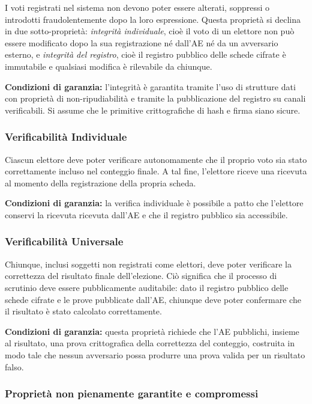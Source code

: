 \documentclass[12pt,a4paper]{article}
\begin{document}
I voti registrati nel sistema non devono poter essere alterati, soppressi o introdotti
fraudolentemente dopo la loro espressione. Questa proprietà si declina in due sotto-proprietà:
\textit{integrità individuale}, cioè il voto di un elettore non può essere modificato dopo la
sua registrazione né dall'AE né da un avversario esterno, e \textit{integrità del registro},
cioè il registro pubblico delle schede cifrate è immutabile e qualsiasi modifica è rilevabile
da chiunque.

\textbf{Condizioni di garanzia:} l'integrità è garantita tramite l'uso di strutture dati con
proprietà di non-ripudiabilità e tramite la pubblicazione del registro su canali verificabili.
Si assume che le primitive crittografiche di hash e firma siano sicure.

\subsubsection{Verificabilità Individuale}

Ciascun elettore deve poter verificare autonomamente che il proprio voto sia stato
correttamente incluso nel conteggio finale. A tal fine, l'elettore riceve una ricevuta al
momento della registrazione della propria scheda.

\textbf{Condizioni di garanzia:} la verifica individuale è possibile a patto che l'elettore
conservi la ricevuta ricevuta dall'AE e che il registro pubblico sia accessibile.

\subsubsection{Verificabilità Universale}

Chiunque, inclusi soggetti non registrati come elettori, deve poter verificare la correttezza
del risultato finale dell'elezione. Ciò significa che il processo di scrutinio deve essere
pubblicamente auditabile: dato il registro pubblico delle schede cifrate e le prove pubblicate
dall'AE, chiunque deve poter confermare che il risultato è stato calcolato correttamente.

\textbf{Condizioni di garanzia:} questa proprietà richiede che l'AE pubblichi, insieme al
risultato, una prova crittografica della correttezza del conteggio, costruita in modo tale che
nessun avversario possa produrre una prova valida per un risultato falso.

\subsubsection{Proprietà non pienamente garantite e compromessi}
\end{document}
